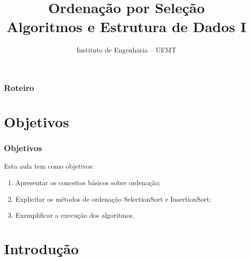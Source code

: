 \documentclass[aspectratio=169]{beamer}
\title[Ordenação por Seleção]{Ordenação por Seleção\\
   Algoritmos e Estrutura de Dados I}
\author[IEng - UFMT]{Instituto de Engenharia -- UFMT}
\date{}
\begin{document}
\begin{frame}[plain]
  \titlepage
\end{frame}


\begin{frame}
\frametitle{Roteiro} %
\tableofcontents %
\end{frame}


\section{Objetivos}

\begin{frame}
\frametitle{Objetivos}
Esta aula tem como objetivos:

\begin{enumerate}
\item Apresentar os conceitos básicos sobre ordenação;
\item Explicitar os métodos de ordenação SelectionSort e InsertionSort;
\item Exemplificar a execução dos algoritmos.
\end{enumerate}
\end{frame}


\section{Introdução} %
\end{document}
